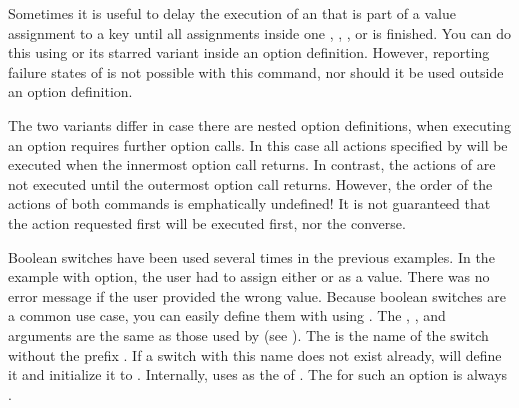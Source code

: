 \begin{Declaration}
\end{Declaration}
Sometimes it is useful to delay the
execution of an  that is part of a value assignment to a key
until all assignments inside one
,
,
, or
 is finished.
You can do this using  or its starred
variant inside an option definition.
However, reporting failure states of  is not possible with this
command, nor should it be used outside an option definition.

The two variants differ in case there are nested option definitions, when
executing an option requires further option calls. In this case all actions
specified by  will be executed when the innermost
option call returns. In contrast, the actions of 
are not executed until the outermost option call returns.
However, the order of the actions of both commands is
emphatically undefined! It is not guaranteed that the action requested first
will be executed first, nor the converse.%
\EndIndexGroup


\begin{Declaration}
\end{Declaration}
Boolean switches have been used several times in the previous examples. In the
example with  option, the user had to assign either
 or  as a value. There was no error message if the
user provided the wrong value. Because boolean switches are a common use case,
you can easily define them with  using .
The , , and  arguments are the same as
those used by  (see
). The  is the
name of the switch without the prefix . If a switch with this name
does not exist already,  will define it and initialize it
to . Internally,  uses 
as the  of . The
 for such an option is always .

